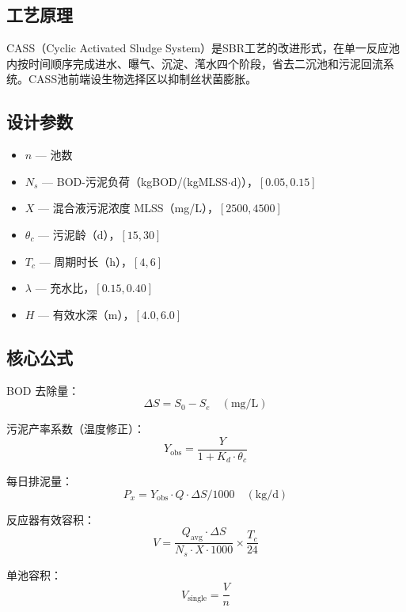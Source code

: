\documentclass[12pt,a4paper]{ctexart}
\begin{document}
\subsection{工艺原理}
CASS（Cyclic Activated Sludge System）是SBR工艺的改进形式，在单一反应池内按时间顺序完成进水、曝气、沉淀、滗水四个阶段，省去二沉池和污泥回流系统。CASS池前端设生物选择区以抑制丝状菌膨胀。

\subsection{设计参数}
\begin{itemize}
  \item $n$ — 池数
  \item $N_s$ — BOD-污泥负荷（kgBOD/(kgMLSS$\cdot$d)），$[0.05, 0.15]$
  \item $X$ — 混合液污泥浓度 MLSS（mg/L），$[2500, 4500]$
  \item $\theta_c$ — 污泥龄（d），$[15, 30]$
  \item $T_c$ — 周期时长（h），$[4, 6]$
  \item $\lambda$ — 充水比，$[0.15, 0.40]$
  \item $H$ — 有效水深（m），$[4.0, 6.0]$
\end{itemize}

\subsection{核心公式}
BOD 去除量：
\begin{equation}
\Delta S = S_0 - S_e \quad (\text{mg/L})
\end{equation}

污泥产率系数（温度修正）：
\begin{equation}
Y_{\text{obs}} = \frac{Y}{1 + K_d \cdot \theta_c}
\end{equation}

每日排泥量：
\begin{equation}
P_x = Y_{\text{obs}} \cdot Q \cdot \Delta S / 1000 \quad (\text{kg/d})
\end{equation}

反应器有效容积：
\begin{equation}
V = \frac{Q_{\text{avg}} \cdot \Delta S}{N_s \cdot X \cdot 1000} \times \frac{T_c}{24}
\end{equation}

单池容积：
\begin{equation}
V_{\text{single}} = \frac{V}{n}
\end{equation}
\end{document}
